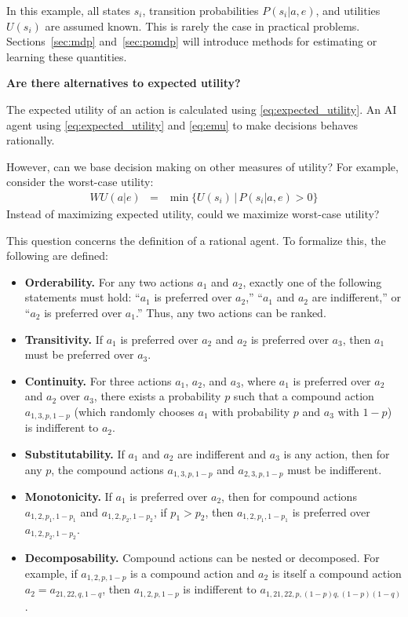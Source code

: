 In this example, all states $s_i$, transition probabilities $P(s_i|a,e)$, and utilities $U(s_i)$ are assumed known. This is rarely the case in practical problems. Sections~\ref{sec:mdp} and~\ref{sec:pomdp} will introduce methods for estimating or learning these quantities.

\begin{mdframed}
	\noindent \textbf{Are there alternatives to expected utility?}
	
	The expected utility of an action is calculated using \eqref{eq:expected_utility}. An AI agent using \eqref{eq:expected_utility} and \eqref{eq:emu} to make decisions behaves rationally. 
	
	However, can we base decision making on other measures of utility? For example, consider the worst-case utility:
	\begin{eqnarray}
		WU(a|e) &=& \min\{U(s_i)\,|\,P(s_i|a,e) > 0\} \nonumber
	\end{eqnarray}
	Instead of maximizing expected utility, could we maximize worst-case utility?
	
	This question concerns the definition of a rational agent. To formalize this, the following  are defined:
	\begin{itemize}
		\item \textbf{Orderability.} For any two actions $a_1$ and $a_2$, exactly one of the following statements must hold: “$a_1$ is preferred over $a_2$,” “$a_1$ and $a_2$ are indifferent,” or “$a_2$ is preferred over $a_1$.” Thus, any two actions can be ranked.
		\item \textbf{Transitivity.} If $a_1$ is preferred over $a_2$ and $a_2$ is preferred over $a_3$, then $a_1$ must be preferred over $a_3$.
		\item \textbf{Continuity.} For three actions $a_1$, $a_2$, and $a_3$, where $a_1$ is preferred over $a_2$ and $a_2$ over $a_3$, there exists a probability $p$ such that a compound action $a_{1,3,p,1-p}$ (which randomly chooses $a_1$ with probability $p$ and $a_3$ with $1-p$) is indifferent to $a_2$.
		\item \textbf{Substitutability.} If $a_1$ and $a_2$ are indifferent and $a_3$ is any action, then for any $p$, the compound actions $a_{1,3,p,1-p}$ and $a_{2,3,p,1-p}$ must be indifferent.
		\item \textbf{Monotonicity.} If $a_1$ is preferred over $a_2$, then for compound actions $a_{1,2,p_1,1-p_1}$ and $a_{1,2,p_2,1-p_2}$, if $p_1 > p_2$, then $a_{1,2,p_1,1-p_1}$ is preferred over $a_{1,2,p_2,1-p_2}$.
		\item \textbf{Decomposability.} Compound actions can be nested or decomposed. For example, if $a_{1,2,p,1-p}$ is a compound action and $a_2$ is itself a compound action $a_2 = a_{21,22,q,1-q}$, then $a_{1,2,p,1-p}$ is indifferent to $a_{1,21,22,p,(1-p)q,(1-p)(1-q)}$.
	\end{itemize}
	

\end{mdframed}
